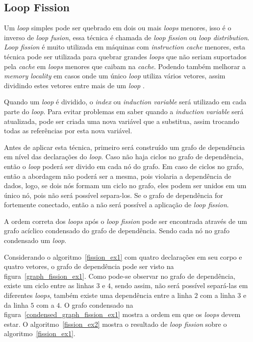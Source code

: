 
\subsection{Loop Fission}

Um \textit{loop} simples pode ser quebrado em dois ou mais \textit{loops}
menores, isso é o inverso de \textit{loop fusion}, essa técnica é chamada de
\textit{loop fission} ou \textit{loop distribution}.
\textit{Loop fission} é muito utilizada em máquinas com 
\textit{instruction cache} menores, esta técnica pode ser utilizada para quebrar
grandes \textit{loops} que não seriam suportados pela \textit{cache} em
\textit{loops} menores que caibam na \textit{cache}.
Podendo também melhorar a \textit{memory locality} em casos onde um único
\textit{loop} utiliza vários vetores, assim dividindo estes vetores entre mais 
de um \textit{loop} \cite{hpcfpc}.

Quando um \textit{loop} é dividido, o \textit{index} ou \textit{induction
variable} será utilizado em cada parte do \textit{loop}. 
Para evitar problemas em saber quando a \textit{induction variable} será
atualizada, pode ser criada uma nova variável que a substitua, assim trocando
todas as referências por esta nova variável.

Antes de aplicar esta técnica, primeiro será construído um grafo de dependência em
nível das declarações do \textit{loop}. 
Caso não haja ciclos no grafo de dependência, então o \textit{loop} poderá ser
divido em cada nó do grafo. 
Em caso de ciclos no grafo, então a abordagem não poderá ser a mesma, pois
violaria a dependência de dados, logo, se dois nós formam um ciclo no grafo,
eles podem ser unidos em um único nó, pois não será possível separa-los.
Se o grafo de dependência for fortemente conectado, então a não será possível a
aplicação de \textit{loop fission}.

A ordem correta dos \textit{loops} após o \textit{loop fission} pode ser
encontrada através de um grafo acíclico condensado do grafo de dependência.
Sendo cada nó no grafo condensado um \textit{loop}.

Considerando o algoritmo~\ref{fission_ex1} com quatro declarações em seu corpo e
quatro vetores, o grafo de dependência pode ser visto na figura~\ref{graph_fission_ex1}. 
Como pode-se observar no grafo de dependência, existe um ciclo entre as linhas
$3$ e $4$, sendo assim, não será possível separá-las em diferentes
\textit{loops}, também existe uma dependência entre a linha $2$ com a linha $3$
e da linha $5$ com a $4$.
O grafo condensado na figura~\ref{condensed_graph_fission_ex1} mostra a
ordem em que os \textit{loops} devem estar.
O algoritmo~\ref{fission_ex2} mostra o resultado de \textit{loop fission} sobre
o algoritmo~\ref{fission_ex1}.

